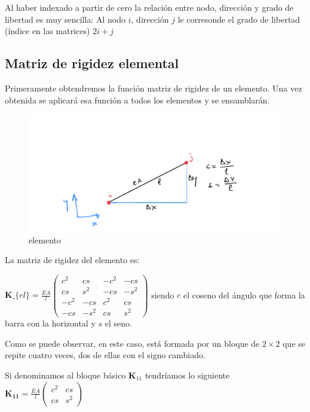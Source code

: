 \documentclass[11pt]{article}
\begin{document}
Al haber indexado a partir de cero la relación entre nodo, dirección y
grado de libertad es muy sencilla: Al nodo $i$, dirección $j$ le
corresonde el grado de libertad (índice en las matrices) $2i+j$

    \hypertarget{matriz-de-rigidez-elemental}{%
\subsection{Matriz de rigidez
elemental}\label{matriz-de-rigidez-elemental}}

Primeramente obtendremos la función matriz de rigidez de un elemento.
Una vez obtenida se aplicará esa función a todos los elementos y se
ensamblarán.

\begin{figure}
\centering
\includegraphics{elemento.png}
\caption{elemento}
\end{figure}

La matriz de rigidez del elemento es:

$ \mathbf{K}\_\{el\} = \frac{EA}{l}
\begin{pmatrix}
c^2 & cs & -c^2 & -cs \\
cs  & s^2 & -cs & -s^2 \\
-c^2 & -cs & c^2 & cs \\
-cs &  -s^2 & cs & s^2
\end{pmatrix}
$ 
siendo $c$ el coseno del ángulo que forma la barra con la
horizontal y $s$ el seno.

Como se puede observar, en este caso, está formada por un bloque de
$2\times2$ que se repite cuatro veces, dos de ellas con el signo
cambiado.

Si denominamos al bloque básico $\mathbf{K}_{11}$ tendríamos lo
siguiente $ \mathbf{K_{11}} = \frac{EA}{l}
\begin{pmatrix}
c^2 & cs \\
cs & s^2 
\end{pmatrix}
$
\end{document}
